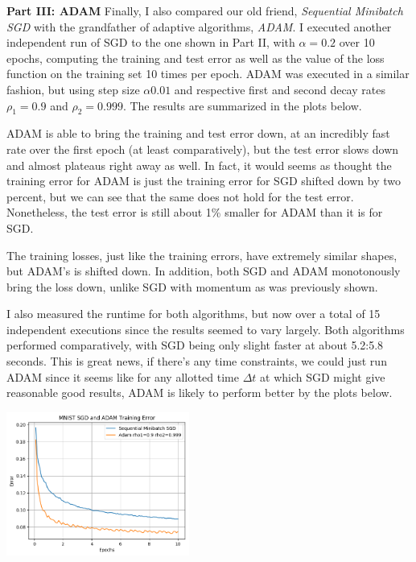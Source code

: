 \documentclass[10pt]{article}
\begin{document}
\begin{multicols}{2}
\textbf{Part III: ADAM}
Finally, I also compared our old friend, \textit{Sequential Minibatch SGD} with the grandfather of adaptive algorithms, \textit{ADAM}. I executed another independent run of SGD to the one shown in Part II, with $\alpha = 0.2$ over 10 epochs, computing the training and test error as well as the value of the loss function on the training set 10 times per epoch. ADAM was executed in a similar fashion, but using step size $\alpha0.01$ and respective first and second decay rates $\rho_1 = 0.9$ and $\rho_2 = 0.999$. The results are summarized in the plots below.\par 
ADAM is able to bring the training and test error down, at an incredibly fast rate over the first epoch (at least comparatively), but the test error slows down and almost plateaus right away as well. In fact, it would seems as thought the training error for ADAM is just the training error for SGD shifted down by two percent, but we can see that the same does not hold for the test error. Nonetheless, the test error is still about 1\% smaller for ADAM than it is for SGD. \par
The training losses, just like the training errors, have extremely similar shapes, but ADAM's is shifted down. In addition, both SGD and ADAM monotonously bring the loss down, unlike SGD with momentum as was previously shown. \par 
I also measured the runtime for both algorithms, but now over a total of 15 independent executions since the results seemed to vary largely. Both algorithms performed comparatively, with SGD being only slight faster at about 5.2:5.8 seconds. This is great news, if there's any time constraints, we could just run ADAM since it seems like for any allotted time $\Delta t$ at which SGD might give reasonable good results, ADAM is likely to perform better by the plots below.\par
\begin{center}
    \includegraphics[width=0.45\textwidth]{SGDandADAMTrainingError.png}
\end{center}

\end{multicols}
\end{document}
